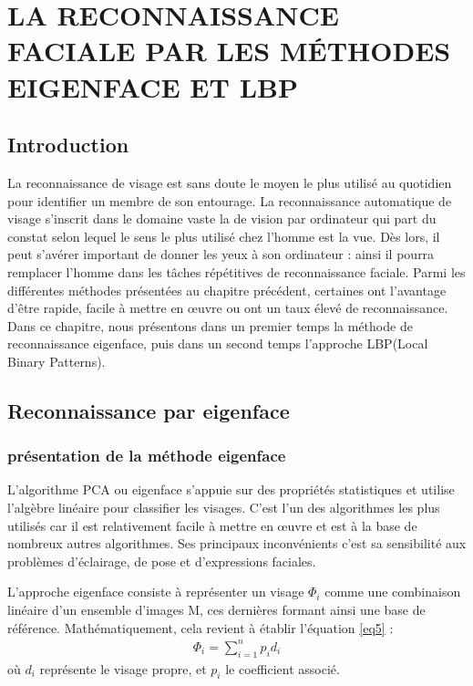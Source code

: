 \chapter[\small LA RECONNAISSANCE FACIALE PAR LES M\'{E}THODES EIGENFACE ET LBP]{LA RECONNAISSANCE FACIALE PAR LES MÉTHODES EIGENFACE ET LBP}
\section{Introduction}
La reconnaissance de visage est sans doute le moyen le plus utilisé au quotidien pour identifier un  membre de son entourage. La reconnaissance automatique de visage s'inscrit dans le domaine vaste la de vision par ordinateur qui part du constat selon lequel le sens le plus utilisé chez l'homme est la vue. Dès lors, il peut s'avérer important de \og donner les yeux à son ordinateur\fg{} : ainsi il pourra remplacer l'homme dans les tâches répétitives de reconnaissance faciale. Parmi les différentes méthodes présentées au chapitre précédent, certaines ont l'avantage d'être rapide, facile à mettre en œuvre ou ont un taux élevé de reconnaissance. Dans ce chapitre, nous présentons dans un premier temps la méthode de reconnaissance eigenface, puis dans un second temps l'approche LBP(Local Binary Patterns). 
\section{Reconnaissance par eigenface}

\subsection{présentation de la méthode eigenface}
L'algorithme PCA ou eigenface s'appuie sur des propriétés statistiques et utilise l'algèbre linéaire pour classifier les visages. C'est l'un des algorithmes les plus utilisés car il est relativement facile à mettre en œuvre et est à la base de nombreux autres algorithmes. Ses principaux inconvénients c'est sa sensibilité aux problèmes d'éclairage, de pose et d'expressions faciales.

L'approche eigenface consiste à représenter un visage $\Phi_{i}$ comme une combinaison linéaire d'un ensemble d'images 
M, ces dernières formant ainsi une base de référence. Mathématiquement, cela revient à établir l'équation \ref{eq5} : 
\begin{eqnarray}
\Phi_{i}=\sum_{i=1}^{n}{p_id_i}
\label{eq5}
\end{eqnarray}
où $d_i$ représente le visage propre, et $p_i$ le coefficient associé.


